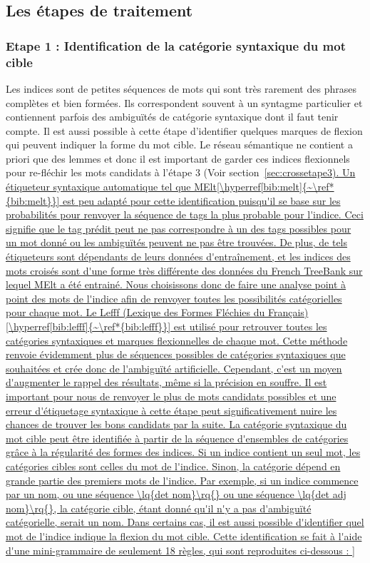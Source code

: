 \subsection{Les étapes de traitement}

\subsubsection{Etape 1 : Identification de la catégorie syntaxique du mot cible}\label{sec:crossetape1}
Les indices sont de petites séquences de mots qui sont très rarement des phrases complètes et bien formées. Ils correspondent souvent à un syntagme particulier et contiennent parfois des ambiguïtés de catégorie syntaxique dont il faut tenir compte. Il est aussi possible à cette étape d'identifier quelques marques de flexion qui peuvent indiquer la forme du mot cible. Le réseau sémantique ne contient a priori que des lemmes et donc il est important de garder ces indices flexionnels pour re-fléchir les mots candidats à l'étape 3 (Voir section~\ref{sec:crossetape3).  

Un étiqueteur syntaxique automatique tel que MElt[\hyperref[bib:melt]{~\ref*{bib:melt}}] est peu adapté pour cette identification puisqu'il se base sur les probabilités pour renvoyer la séquence de tags la plus probable pour l'indice. Ceci signifie que le tag prédit peut ne pas correspondre à un des tags possibles pour un mot donné ou les ambiguïtés peuvent ne pas être trouvées. De plus, de tels étiqueteurs sont dépendants de leurs données d'entraînement, et les indices des mots croisés sont d'une forme très différente des données du French TreeBank sur lequel MElt a été entrainé. Nous choisissons donc de faire une analyse point à point des mots de l'indice afin de renvoyer toutes les possibilités catégorielles pour chaque mot. Le Lefff (Lexique des Formes Fléchies du Français)[\hyperref[bib:lefff]{~\ref*{bib:lefff}}] est utilisé pour retrouver toutes les catégories syntaxiques et marques flexionnelles de chaque mot. Cette méthode renvoie évidemment plus de séquences possibles de catégories syntaxiques que souhaitées et crée donc de l'ambiguïté artificielle. Cependant, c'est un moyen d'augmenter le rappel des résultats, même si la précision en souffre. Il est important pour nous de renvoyer le plus de mots candidats possibles et une erreur d'étiquetage syntaxique à cette étape peut significativement nuire les chances de trouver les bons candidats par la suite.

La catégorie syntaxique du mot cible peut être identifiée à partir de la séquence d'ensembles de catégories grâce à la régularité des formes des indices. Si un indice contient un seul mot, les catégories cibles sont celles du mot de l'indice. Sinon, la catégorie dépend en grande partie des premiers mots de l'indice. Par exemple, si un indice commence par un nom, ou une séquence \lq{det nom}\rq{} ou une séquence \lq{det adj nom}\rq{}, la catégorie cible, étant donné qu'il n'y a pas d'ambiguïté catégorielle, serait un nom. Dans certains cas, il est aussi possible d'identifier quel mot de l'indice indique la flexion du mot cible. Cette identification se fait à l'aide d'une mini-grammaire de seulement 18 règles, qui sont reproduites ci-dessous :

}

